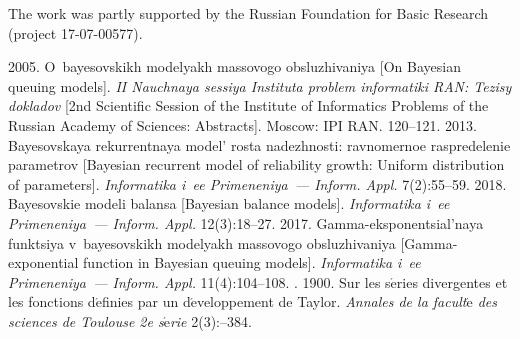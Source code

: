 

 


\Ack
\noindent
The work was partly supported by the Russian Foundation for Basic 
Research (project 17-07-00577).



  \begin{multicols}{2}

\renewcommand{\bibname}{\protect\rmfamily References}

{\small\frenchspacing
 {%
 \begin{thebibliography}{99}

 2005. O~bayesovskikh modelyakh massovogo obsluzhivaniya 
[On Bayesian queuing models]. 
 \textit{II Nauchnaya sessiya Instituta problem informatiki RAN: Tezisy dokladov}
  [2nd Scientific Session of the Institute of Informatics Problems of the 
  Russian Academy of Sciences: Abstracts]. Moscow: IPI RAN. 120--121.
2013. Bayesovskaya rekurrentnaya model' rosta nadezhnosti: 
ravnomernoe raspredelenie parametrov [Bayesian recurrent model of reliability growth: 
Uniform distribution of parameters]. 
 \textit{Informatika i~ee Primeneniya~--- Inform. Appl.} 7(2):55--59.
 2018. Bayesovskie modeli balansa 
[Bayesian balance models]. 
 \textit{Informatika i~ee Primeneniya~--- Inform. Appl.} 12(3):18--27.
 2017. Gamma-eksponentsial'naya funktsiya v~bayesovskikh modelyakh 
 massovogo obsluzhivaniya [Gamma-exponential function in Bayesian queuing models]. 
 \textit{Informatika i~ee Primeneniya~--- Inform. Appl.} 11(4):104--108.
. 1900. Sur les s$\acute{\mbox{e}}$ries 
divergentes et les fonctions d$\acute{\mbox{e}}$finies par un 
d$\acute{\mbox{e}}$veloppement de Taylor. 
\textit{Annales de la facult$\acute{\mbox{e}}$ des sciences de Toulouse 2e s$\acute{\mbox{e}}$rie}
2(3):--384.


\end{thebibliography}}}
\end{multicols}
